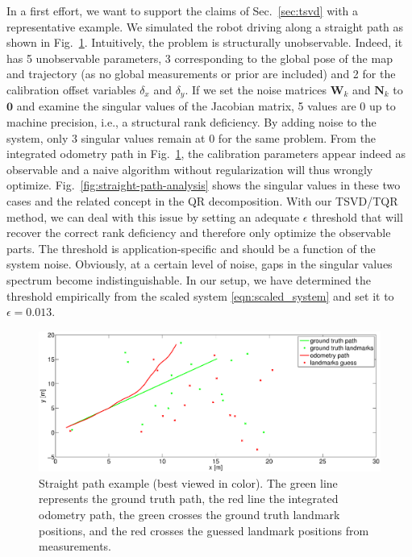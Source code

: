 In a first effort, we want to support the claims of Sec.~\ref{sec:tsvd} with
a representative example. We simulated the robot driving along a straight
path as shown in Fig.~\ref{fig:straight-path}. Intuitively, the problem is
structurally unobservable. Indeed, it has 5 unobservable parameters, 3
corresponding to the global pose of the map and trajectory (as no global
measurements or prior are included) and 2 for the calibration offset variables
$\delta_x$ and $\delta_y$. If we set the noise matrices $\mathbf{W}_k$ and
$\mathbf{N}_k$ to $\mathbf{0}$ and examine the singular values of the Jacobian
matrix, 5 values are $0$ up to machine precision, i.e., a structural rank
deficiency. By adding noise to the system, only 3 singular values remain at $0$
for the same problem. From the integrated odometry path in
Fig.~\ref{fig:straight-path}, the calibration parameters appear indeed as
observable and a naive algorithm without regularization will thus wrongly
optimize. Fig.~\ref{fig:straight-path-analysis} shows the singular values in
these two cases and the related concept in the QR decomposition. With our
TSVD/TQR method, we can deal with this issue by setting an adequate $\epsilon$
threshold that will recover the correct rank deficiency and therefore only
optimize the observable parts. The threshold is application-specific and should
be a function of the system noise. Obviously, at a certain level of noise, gaps
in the singular values spectrum become indistinguishable. In our setup, we have
determined the threshold empirically from the scaled system
\eqref{eqn:scaled_system} and set it to $\epsilon=0.013$.

\begin{figure}[t]
\centering
\includegraphics[width=\columnwidth]{fig/straight-path.eps}
\caption{Straight path example (best viewed in color). The green line
  represents the ground truth path, the red line the integrated odometry path,
  the green crosses the ground truth landmark positions, and the red crosses the
  guessed landmark positions from measurements.}
\label{fig:straight-path}
\end{figure}

